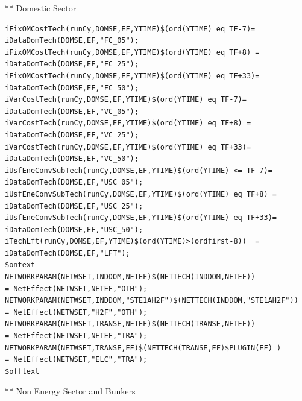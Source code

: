 \documentclass[a4paper,]{scrartcl}
\begin{document}
** Domestic Sector

\begin{lstlisting}
iFixOMCostTech(runCy,DOMSE,EF,YTIME)$(ord(YTIME) eq TF-7)= iDataDomTech(DOMSE,EF,"FC_05");
iFixOMCostTech(runCy,DOMSE,EF,YTIME)$(ord(YTIME) eq TF+8) = iDataDomTech(DOMSE,EF,"FC_25");
iFixOMCostTech(runCy,DOMSE,EF,YTIME)$(ord(YTIME) eq TF+33)= iDataDomTech(DOMSE,EF,"FC_50");
iVarCostTech(runCy,DOMSE,EF,YTIME)$(ord(YTIME) eq TF-7)= iDataDomTech(DOMSE,EF,"VC_05");
iVarCostTech(runCy,DOMSE,EF,YTIME)$(ord(YTIME) eq TF+8) = iDataDomTech(DOMSE,EF,"VC_25");
iVarCostTech(runCy,DOMSE,EF,YTIME)$(ord(YTIME) eq TF+33)= iDataDomTech(DOMSE,EF,"VC_50");
iUsfEneConvSubTech(runCy,DOMSE,EF,YTIME)$(ord(YTIME) <= TF-7)= iDataDomTech(DOMSE,EF,"USC_05");
iUsfEneConvSubTech(runCy,DOMSE,EF,YTIME)$(ord(YTIME) eq TF+8) = iDataDomTech(DOMSE,EF,"USC_25");
iUsfEneConvSubTech(runCy,DOMSE,EF,YTIME)$(ord(YTIME) eq TF+33)= iDataDomTech(DOMSE,EF,"USC_50");
iTechLft(runCy,DOMSE,EF,YTIME)$(ord(YTIME)>(ordfirst-8))  = iDataDomTech(DOMSE,EF,"LFT");
$ontext
NETWORKPARAM(NETWSET,INDDOM,NETEF)$(NETTECH(INDDOM,NETEF))                               = NetEffect(NETWSET,NETEF,"OTH");
NETWORKPARAM(NETWSET,INDDOM,"STE1AH2F")$(NETTECH(INDDOM,"STE1AH2F"))                     = NetEffect(NETWSET,"H2F","OTH");
NETWORKPARAM(NETWSET,TRANSE,NETEF)$(NETTECH(TRANSE,NETEF))                               = NetEffect(NETWSET,NETEF,"TRA");
NETWORKPARAM(NETWSET,TRANSE,EF)$(NETTECH(TRANSE,EF)$PLUGIN(EF) )                         = NetEffect(NETWSET,"ELC","TRA");
$offtext
\end{lstlisting}

** Non Energy Sector and Bunkers
\end{document}
